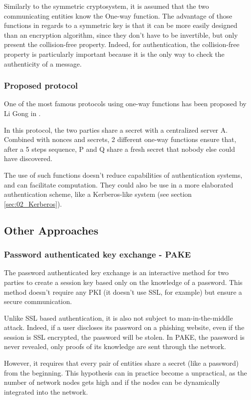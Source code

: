 Similarly to the symmetric cryptosystem, it is assumed that the two communicating entities know the One-way function. The advantage of those functions in regards to a symmetric key is that it can be more easily designed than an encryption algorithm, since they don't have to be invertible, but only present the collision-free property. Indeed, for authentication, the collision-free property is particularly important because it is the only way to check the authenticity of a message.

\subsubsection{Proposed protocol}
One of the most famous protocols using one-way functions has been proposed by Li Gong\cite{Gong1989} in .

In this protocol, the two parties share a secret with a centralized server A. Combined with nonces and secrets, 2 different one-way functions ensure that, after a 5 steps sequence, P and Q share a fresh secret that nobody else could have discovered.

The use of such functions doesn't reduce capabilities of authentication systems, and can facilitate computation. They could also be use in a more elaborated authentication scheme, like a Kerberos-like system (see section \ref{sec:02_Kerberos}).

\subsection{Other Approaches}

\subsubsection{Password authenticated key exchange - PAKE}
The password authenticated key exchange is an interactive method for two parties to create a session key based only on the knowledge of a password. This method doesn't require any PKI (it doesn't use SSL, for example) but ensure a secure communication.

Unlike SSL based authentication, it is also not subject to man-in-the-middle attack. Indeed, if a user discloses its password on a phishing website, even if the session is SSL encrypted, the password will be stolen. In PAKE, the password is never revealed, only proofs of its knowledge are sent through the network.

However, it requires that every pair of entities share a secret (like a password) from the beginning. This hypothesis can in practice become a unpractical, as the number of network nodes gets high and if the nodes can be dynamically integrated into the network.

